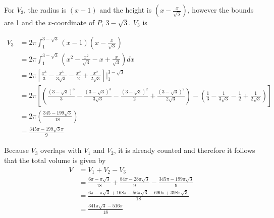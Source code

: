 \documentclass{article}
\begin{document}
    For $V_3$, the radius is $(x-1)$ and the height is $\left(x-\frac{x}{\sqrt{3}}\right)$, however the bounds are 1 and the $x$-coordinate of $P$, $3-\sqrt{3}$. $V_3$ is

    \begin{align*}
        V_3 &= 2\pi\int_1^{3-\sqrt{3}} (x-1)\left(x-\frac{x}{\sqrt{3}}\right) \\
            &= 2\pi\int_1^{3-\sqrt{3}} \left(x^2-\frac{x^2}{\sqrt{3}}-x+\frac{x}{\sqrt{3}}\right)dx \\
            &= 2\pi\left[\frac{x^3}{3}-\frac{x^3}{3\sqrt{3}}-\frac{x^2}{2}+\frac{x^2}{2\sqrt{3}}\right]\Bigg|_1^{3-\sqrt{3}} \\
            &= 2\pi\left[\left(\frac{(3-\sqrt{3})^3}{3}-\frac{(3-\sqrt{3})^3}{3\sqrt{3}}-\frac{(3-\sqrt{3})^2}{2}+\frac{(3-\sqrt{3})^2}{2\sqrt{3}}\right)-\left(\frac{1}{3}-\frac{1}{3\sqrt{3}}-\frac{1}{2}+\frac{1}{2\sqrt{3}}\right)\right] \\
            &= 2\pi\left(\frac{345-199\sqrt{3}}{18}\right) \\
            &= \frac{345\pi-199\sqrt{3}\pi}{9}
    \end{align*}

    Because $V_3$ overlaps with $V_1$ and $V_2$, it is already counted and therefore it follows that the total volume is given by
    \begin{align*}
        V   &= V_1 + V_2 - V_3 \\
            &= \frac{6\pi-\pi\sqrt{3}}{18} + \frac{84\pi-28\pi\sqrt{3}}{9} - \frac{345\pi-199\pi\sqrt{3}}{9} \\
            &= \frac{6\pi-\pi\sqrt{3}+168\pi-56\pi\sqrt{3}-690\pi+398\pi\sqrt{3}}{18} \\
            &= \frac{341\pi\sqrt{3}-516\pi}{18}
    \end{align*}

    \pagebreak
\end{document}

